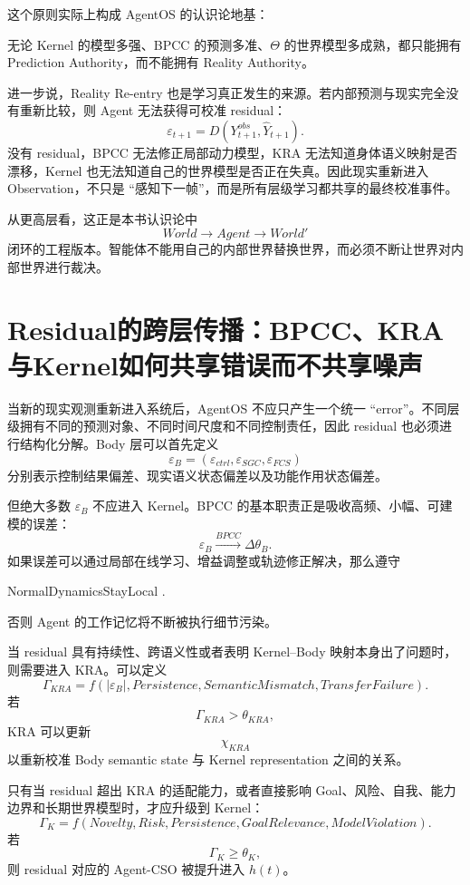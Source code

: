 这个原则实际上构成 AgentOS 的认识论地基：
\begin{statementbox}
\centering
{}
\end{statementbox}
无论 Kernel 的模型多强、BPCC 的预测多准、$\Theta$ 的世界模型多成熟，都只能拥有 Prediction Authority，而不能拥有 Reality Authority。

进一步说，Reality Re-entry 也是学习真正发生的来源。若内部预测与现实完全没有重新比较，则 Agent 无法获得可校准 residual：
\[
\varepsilon_{t+1}
=
D
\left(
Y^{obs}_{t+1},
\hat Y_{t+1}
\right).
\]
没有 residual，BPCC 无法修正局部动力模型，KRA 无法知道身体语义映射是否漂移，Kernel 也无法知道自己的世界模型是否正在失真。因此现实重新进入 Observation，不只是 ``感知下一帧''，而是所有层级学习都共享的最终校准事件。

从更高层看，这正是本书认识论中
\[
World
\rightarrow
Agent
\rightarrow
World'
\]
闭环的工程版本。智能体不能用自己的内部世界替换世界，而必须不断让世界对内部世界进行裁决。


\section{Residual的跨层传播：BPCC、KRA与Kernel如何共享错误而不共享噪声}

当新的现实观测重新进入系统后，AgentOS 不应只产生一个统一 ``error''。不同层级拥有不同的预测对象、不同时间尺度和不同控制责任，因此 residual 也必须进行结构化分解。Body 层可以首先定义
\[
\boxed{
\varepsilon_B
=
\left(
\varepsilon_{ctrl},
\varepsilon_{SGC},
\varepsilon_{FCS}
\right)
}
\]
分别表示控制结果偏差、现实语义状态偏差以及功能作用状态偏差。

但绝大多数 $\varepsilon_B$ 不应进入 Kernel。BPCC 的基本职责正是吸收高频、小幅、可建模的误差：
\[
\varepsilon_B
\xrightarrow{BPCC}
\Delta\theta_B .
\]
如果误差可以通过局部在线学习、增益调整或轨迹修正解决，那么遵守
\begin{statementbox}
NormalDynamicsStayLocal .
\end{statementbox}
否则 Agent 的工作记忆将不断被执行细节污染。

当 residual 具有持续性、跨语义性或者表明 Kernel--Body 映射本身出了问题时，则需要进入 KRA。可以定义
\[
\Gamma_{KRA}
=
f
\left(
|\varepsilon_B|,
Persistence,
SemanticMismatch,
TransferFailure
\right).
\]
若
\[
\Gamma_{KRA}>\theta_{KRA},
\]
KRA 可以更新
\[
\chi_{KRA}
\]
以重新校准 Body semantic state 与 Kernel representation 之间的关系。

只有当 residual 超出 KRA 的适配能力，或者直接影响 Goal、风险、自我、能力边界和长期世界模型时，才应升级到 Kernel：
\[
\Gamma_K
=
f
\left(
Novelty,
Risk,
Persistence,
GoalRelevance,
ModelViolation
\right).
\]
若
\[
\Gamma_K\geq\theta_K,
\]
则 residual 对应的 Agent-CSO 被提升进入 $h(t)$。

